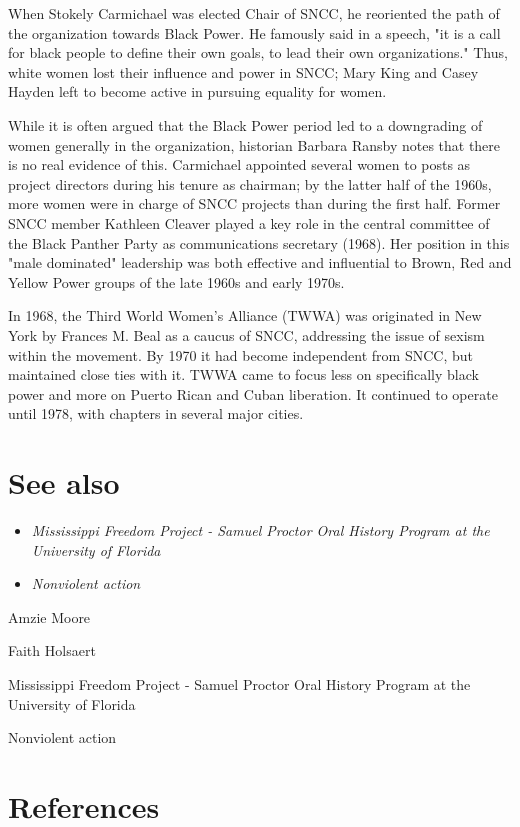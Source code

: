 When Stokely Carmichael was elected Chair of SNCC, he reoriented the
path of the organization towards Black Power. He famously said in a
speech, "it is a call for black people to define their own goals, to
lead their own organizations." Thus, white women lost their influence
and power in SNCC; Mary King and Casey Hayden left to become active in
pursuing equality for women.

While it is often argued that the Black Power period led to a
downgrading of women generally in the organization, historian Barbara
Ransby notes that there is no real evidence of this. Carmichael
appointed several women to posts as project directors during his tenure
as chairman; by the latter half of the 1960s, more women were in charge
of SNCC projects than during the first half. Former SNCC member Kathleen
Cleaver played a key role in the central committee of the Black Panther
Party as communications secretary (1968). Her position in this "male
dominated" leadership was both effective and influential to Brown, Red
and Yellow Power groups of the late 1960s and early 1970s.

In 1968, the Third World Women's Alliance (TWWA) was originated in New
York by Frances M. Beal as a caucus of SNCC, addressing the issue of
sexism within the movement. By 1970 it had become independent from SNCC,
but maintained close ties with it. TWWA came to focus less on
specifically black power and more on Puerto Rican and Cuban liberation.
It continued to operate until 1978, with chapters in several major
cities.

\section{See also}\label{see-also}

\begin{itemize}
\item
  \emph{Mississippi Freedom Project - Samuel Proctor Oral History
  Program at the University of Florida}
\item
  \emph{Nonviolent action}
\end{itemize}

Amzie Moore

Faith Holsaert

Mississippi Freedom Project - Samuel Proctor Oral History Program at the
University of Florida

Nonviolent action

\section{References}\label{references}

